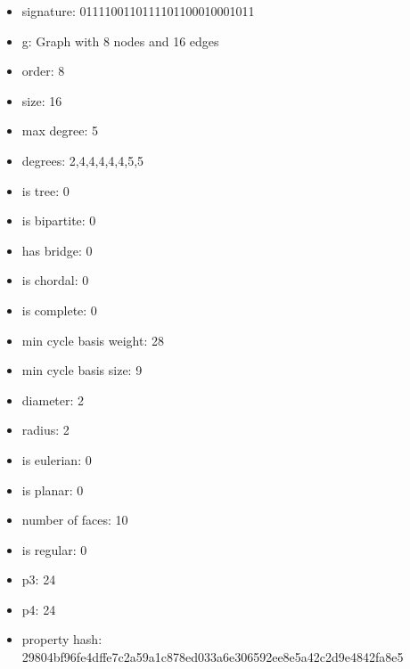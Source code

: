 \begin{itemize}
\item signature: 0111100110111101100010001011
\item g: Graph with 8 nodes and 16 edges
\item order: 8
\item size: 16
\item max degree: 5
\item degrees: 2,4,4,4,4,4,5,5
\item is tree: 0
\item is bipartite: 0
\item has bridge: 0
\item is chordal: 0
\item is complete: 0
\item min cycle basis weight: 28
\item min cycle basis size: 9
\item diameter: 2
\item radius: 2
\item is eulerian: 0
\item is planar: 0
\item number of faces: 10
\item is regular: 0
\item p3: 24
\item p4: 24
\item property hash: 29804bf96fe4dffe7c2a59a1c878ed033a6e306592ee8e5a42c2d9e4842fa8e5
\end{itemize}
\newpage
\begin{figure}
\end{figure}
